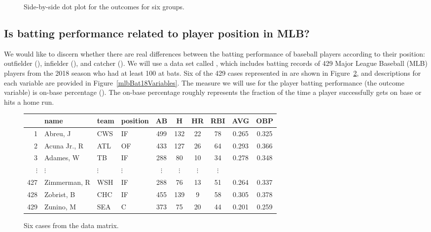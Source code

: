 \begin{figure}[h]
  \centering
  \caption{Side-by-side dot plot for the outcomes for six groups.}
  \label{toyANOVA}
\end{figure}


\subsection{Is batting performance related to player position in MLB?}


\newcommand{\mlbdata}{\data{bat18}}
\newcommand{\mlbN}{429}
\newcommand{\mlbK}{3}
\newcommand{\mlbMinAB}{100}
\newcommand{\mlbDFA}{2}
\newcommand{\mlbDFB}{426}
\newcommand{\mlbF}{5.077}
\newcommand{\mlbPvalue}{0.0066}

We would like to discern whether there are real differences
between the batting performance of baseball players according
to their position:
outfielder (), infielder (),
and catcher ().
We will use a data set called \mlbdata{},
which includes batting records of \mlbN{} Major League
Baseball (MLB) players from the 2018 season who had
at least \mlbMinAB{} at bats.
Six of the \mlbN{} cases represented in \mlbdata{}
are shown in Figure~\ref{mlbBat18DataMatrix},
and descriptions for each variable are provided
in Figure~\ref{mlbBat18Variables}.
The measure we will use for the player batting
performance (the outcome variable) is on-base
percentage ().
The on-base percentage roughly represents the fraction
of the time a player successfully gets on base or hits
a home run.

\begin{figure}[h]
\centering
\begin{tabular}{r lll ccc ccc}
  \hline
  & name & team & position & AB & H & HR &RBI & AVG & OBP \\ 
  \hline
  1 &  Abreu, J & CWS & IF &  499 &  132 &   22 &
      78 & 0.265 & 0.325 \\
  2 &  Acuna Jr., R & ATL & OF &  433 &  127 &   26 &
      64 & 0.293 & 0.366 \\
  3 &  Adames, W & TB & IF &  288 &   80 &   10 &
      34 & 0.278 & 0.348 \\
  $\vdots$ & $\vdots$ & $\vdots$ & $\vdots$ & $\vdots$ &
      $\vdots$ & $\vdots$ & $\vdots$ \\
  427 &  Zimmerman, R & WSH & IF & 288 &   76 &
      13 &   51 & 0.264 & 0.337 \\
  428 &  Zobrist, B & CHC & IF &  455 &  139 &    9 &   58 & 0.305 & 0.378 \\
  \mlbN{} &  Zunino, M & SEA & C &  373 &   75 &   20 &
      44 & 0.201 & 0.259 \\
   \hline
\end{tabular}
\caption{Six cases from the \mlbdata{} data matrix.}
\label{mlbBat18DataMatrix}
\end{figure}

